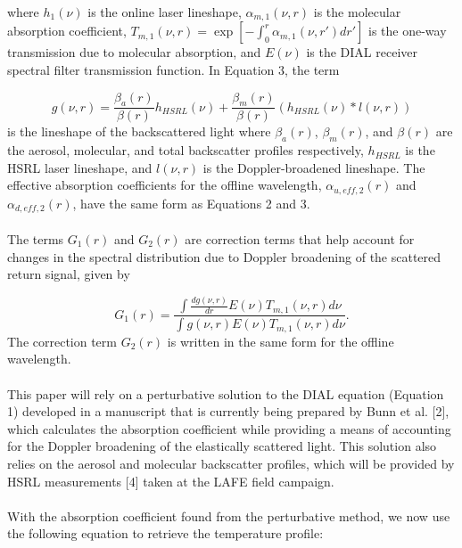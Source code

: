 \documentclass[twoside]{article}
\begin{document}
\noindent where $h_1(\nu)$ is the online laser lineshape, $\alpha_{m,1}(\nu,r)$ is the molecular absorption coefficient, $T_{m,1}(\nu,r) = \exp\left[-\int^r_0 \alpha_{m,1}(\nu,r')dr'\right]$ is the one-way transmission due to molecular absorption, and $E(\nu)$ is the DIAL receiver spectral filter transmission function. 
In Equation 3, the term

\begin{equation}
	g(\nu,r) = \frac{\beta_a(r)}{\beta(r)} h_{HSRL}(\nu) + \frac{\beta_m(r)}{\beta(r)} (h_{HSRL}(\nu)\ast l(\nu,r))
\end{equation}
\noindent is the lineshape of the backscattered light where $\beta_a(r)$, $\beta_m(r)$, and $\beta(r)$ are the aerosol, molecular, and total backscatter profiles respectively, $h_{HSRL}$ is the HSRL laser lineshape, and $l(\nu,r)$ is the Doppler-broadened lineshape. 
The effective absorption coefficients for the offline wavelength, $\alpha_{u,eff,2}(r)$ and $\alpha_{d,eff,2}(r)$, have the same form as Equations 2 and 3.
\\
\\
The terms $G_1(r)$ and $G_2(r)$ are correction terms that help account for changes in the spectral distribution due to Doppler broadening of the scattered return signal, given by

\begin{equation}
	G_1(r) = \frac{\int \frac{dg(\nu,r)}{dr} E(\nu) T_{m,1}(\nu,r) d\nu}{\int g(\nu,r) E(\nu) T_{m,1}(\nu,r) d\nu}.
\end{equation}
\noindent The correction term $G_2(r)$ is written in the same form for the offline wavelength.
\\
\\
This paper will rely on a perturbative solution to the DIAL equation (Equation 1) developed in a manuscript that is currently being prepared by Bunn et al. [2], which calculates the absorption coefficient while providing a means of accounting for the Doppler broadening of the elastically scattered light. 
This solution also relies on the aerosol and molecular backscatter profiles, which will be provided by HSRL measurements [4] taken at the LAFE field campaign.
\\
\\
With the absorption coefficient found from the perturbative method, we now use the following equation to retrieve the temperature profile:
\end{document}
